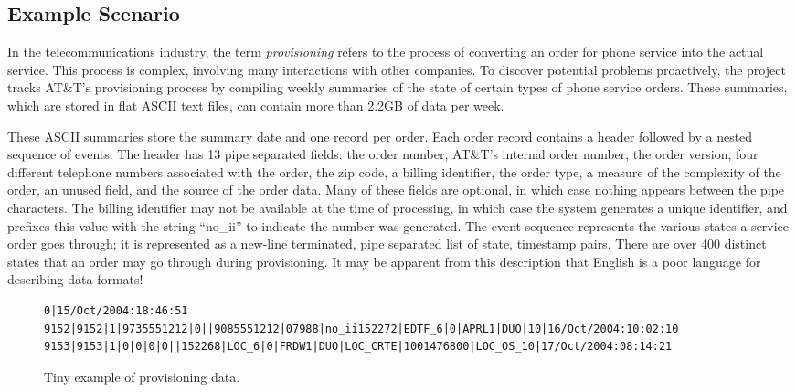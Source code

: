 \subsection{Example Scenario}
\label{subsec:example}

In the telecommunications industry, the term \textit{provisioning} refers to
the process of converting an order for phone service into the
actual service.  This process is complex, involving many interactions
with other companies.  To discover potential problems proactively, the \dibbler{}
project tracks AT\&T's provisioning process by compiling weekly
summaries of the state of certain types of phone service orders.
These summaries, which are stored in flat ASCII text files, can
contain more than 2.2GB of data per week.

These ASCII summaries store the summary date
and one record per order.  Each order record contains a header
followed by a nested sequence of events.  The header has 13 pipe
separated fields: the order number, AT\&T's internal order number, the
order version, four different telephone numbers associated with the
order, the zip code, a billing identifier, the order
type, a measure of the complexity of the order, an unused field, and
the source of the order data.  Many of these fields are optional, in
which case nothing appears between the pipe characters.  The billing
identifier may not be available at the time of processing, in which
case the system generates a unique identifier, and prefixes this value
with the string ``no\_ii'' to indicate the number was generated. The
event sequence represents the various states a service order goes
through; it is represented as a new-line terminated, pipe separated
list of state, timestamp pairs.  There are over 400 distinct states
that an order may go through during provisioning.  It may be apparent from
this description that English is a poor language for describing data
formats!

\begin{figure*}
\begin{small}
\begin{center}
\begin{verbatim}
0|15/Oct/2004:18:46:51
9152|9152|1|9735551212|0||9085551212|07988|no_ii152272|EDTF_6|0|APRL1|DUO|10|16/Oct/2004:10:02:10
9153|9153|1|0|0|0|0||152268|LOC_6|0|FRDW1|DUO|LOC_CRTE|1001476800|LOC_OS_10|17/Oct/2004:08:14:21
\end{verbatim}
\caption{Tiny example of \dibbler{} provisioning data.}
\label{figure:dibbler-records}
\end{center}
\end{small}
\end{figure*}

